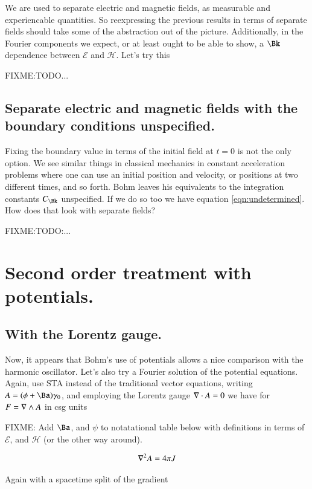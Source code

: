 \documentclass{article}
\newcommand{\EE}[0]{\boldsymbol{\mathcal{E}}}
\newcommand{\HH}[0]{\boldsymbol{\mathcal{H}}}
\begin{document}
We are used to separate electric and magnetic fields, as measurable and experiencable quantities.  So reexpressing the previous results 
in terms of separate fields should take some of the abstraction out of the picture.  Additionally, in the Fourier components we expect, or at least ought to be able to show, a $\Bk$ dependence between $\EE$ and $\HH$.  Let's try this

FIXME:TODO...

\subsection{ Separate electric and magnetic fields with the boundary conditions unspecified. }

Fixing the boundary value in terms of the initial field at $t=0$ is not the only option.  We see similar things in classical mechanics in constant acceleration problems where one can use an initial position and velocity, or positions at two different times, and so forth.  Bohm leaves his equivalents to the integration constants $C_{\Bk}$ unspecified.  If we do so too we have equation \ref{eqn:undetermined}.  How does that look with separate fields?

FIXME:TODO:...  

\section{ Second order treatment with potentials. }

\subsection{ With the Lorentz gauge. }

Now, it appears that Bohm's use of potentials allows a nice comparison with the harmonic oscillator.  Let's also try a Fourier solution of the 
potential equations.  Again, use STA instead of the traditional vector equations, writing $A = (\phi + \Ba)\gamma_0$, and employing the Lorentz gauge
$\nabla \cdot A = 0$ we have for $F = \nabla \wedge A$ in csg units

FIXME: Add $\Ba$, and $\psi$ to notatational table below with definitions in terms of $\EE$, and $\HH$ (or the other way around).

\begin{align*}
\nabla^2 A = 4 \pi J
\end{align*}

Again with a spacetime split of the gradient
\end{document}
